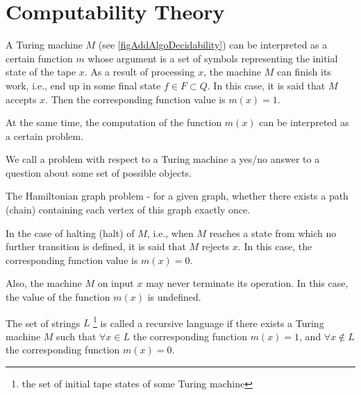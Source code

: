 \section{Computability Theory}

A Turing machine $M$ (see \autoref{figAddAlgoDecidability}) can be interpreted as a certain function $m$ whose argument is a set of symbols representing the initial state of the tape $x$. As a result of processing $x$, the machine $M$ can finish its work, i.e., end up in some final state $f \in F \subset Q$. In this case, it is said that $M$ accepts $x$. Then the corresponding function value is $m(x) = 1$. 

At the same time, the computation of the function $m(x)$ can be interpreted as a certain problem.  
\begin{definition}[Problem]
We call a problem with respect to a Turing machine a yes/no answer to a question about some set of possible objects.
\end{definition}

\begin{example}
The Hamiltonian graph problem - for a given graph, whether there exists a path (chain) containing each vertex of this graph exactly once.
\nonumber
\end{example}




In the case of halting (halt) of $M$, i.e., when $M$ reaches a state from which no further transition is defined, it is said that $M$ rejects $x$. In this case, the corresponding function value is $m(x) = 0$. 

Also, the machine $M$ on input $x$ may never terminate its operation. In this case, the value of the function $m(x)$ is undefined.    

\begin{definition}
The set of strings $L$
\footnote{the set of initial tape states of some
Turing machine}
is called a recursive language if there exists a Turing machine $M$
such that $\forall x \in L$ the corresponding function $m(x) = 1$, and 
$\forall x \notin L$ the corresponding function $m(x) = 0$. 
\end{definition}

